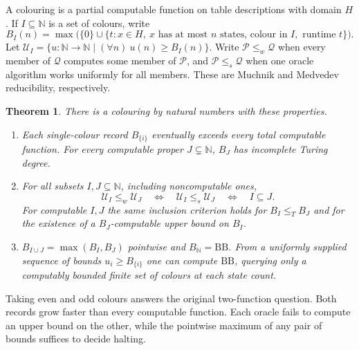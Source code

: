 \documentclass[11pt]{article}
\newtheorem{theorem}{Theorem}
\newcommand{\BB}{\mathrm{BB}}
\newcommand{\om}{\mathbb N}
\begin{document}
A colouring is a partial computable function on table descriptions with domain $H$. If $I\subseteq\om$ is a set of colours, write
\[
 B_I(n)=\max\bigl(\{0\}\cup\{t:x\in H,\ x\text{ has at most }n\text{ states, colour in }I,\text{ runtime }t\}\bigr).
\]
Let $\mathcal U_I=\{u:\om\to\om\mid(\forall n)\ u(n)\ge B_I(n)\}$. Write $\mathcal P\le_w\mathcal Q$ when every member of $\mathcal Q$ computes some member of $\mathcal P$, and $\mathcal P\le_s\mathcal Q$ when one oracle algorithm works uniformly for all members. These are Muchnik and Medvedev reducibility, respectively.
\begin{theorem}\label{main}
There is a colouring by natural numbers with these properties.
\begin{enumerate}
\item Each single-colour record $B_{\{i\}}$ eventually exceeds every total computable function. For every computable proper $J\subsetneq\om$, $B_J$ has incomplete Turing degree.
\item For all subsets $I,J\subseteq\om$, including noncomputable ones,
\[
 \mathcal U_I\le_w\mathcal U_J\quad\Longleftrightarrow\quad
 \mathcal U_I\le_s\mathcal U_J\quad\Longleftrightarrow\quad I\subseteq J.
\]
For computable $I,J$ the same inclusion criterion holds for $B_I\le_T B_J$ and for the existence of a $B_J$-computable upper bound on $B_I$.
\item $B_{I\cup J}=\max(B_I,B_J)$ pointwise and $B_{\om}=\BB$. From a uniformly supplied sequence of bounds $u_i\ge B_{\{i\}}$ one can compute $\BB$, querying only a computably bounded finite set of colours at each state count.
\end{enumerate}
\end{theorem}
Taking even and odd colours answers the original two-function question. Both records grow faster than every computable function. Each oracle fails to compute an upper bound on the other, while the pointwise maximum of any pair of bounds suffices to decide halting.
\end{document}

